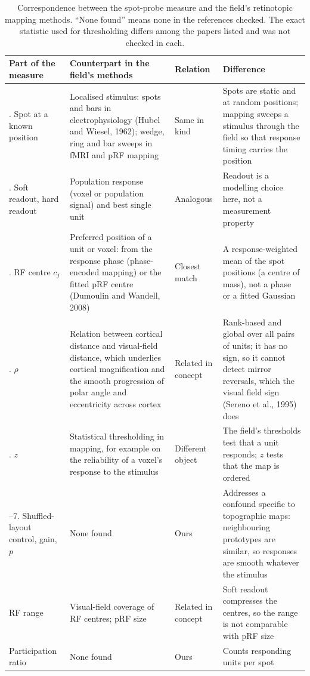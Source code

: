 \documentclass[11pt,a4paper]{article}
\newcommand{\ra}{\raggedright\arraybackslash}
\begin{document}
\begin{table}[h]
\centering\footnotesize
\setlength{\tabcolsep}{3pt}
\begin{tabular}{@{}>{\ra}p{3.0cm}>{\ra}p{4.9cm}>{\ra}p{1.9cm}>{\ra}p{4.6cm}@{}}
\toprule
Part of the measure & Counterpart in the field's methods & Relation & Difference \\
\midrule
1. Spot at a known position
  & Localised stimulus: spots and bars in electrophysiology (Hubel and Wiesel, 1962);
    wedge, ring and bar sweeps in fMRI and pRF mapping
  & Same in kind
  & Spots are static and at random positions; mapping sweeps a stimulus through the field
    so that response timing carries the position \\
2. Soft readout, hard readout
  & Population response (voxel or population signal) and best single unit
  & Analogous
  & Readout is a modelling choice here, not a measurement property \\
3. RF centre $c_j$
  & Preferred position of a unit or voxel: from the response phase (phase-encoded
    mapping) or the fitted pRF centre (Dumoulin and Wandell, 2008)
  & Closest match
  & A response-weighted mean of the spot positions (a centre of mass), not a phase
    or a fitted Gaussian \\
4. $\rho$
  & Relation between cortical distance and visual-field distance, which underlies
    cortical magnification and the smooth progression of polar angle and eccentricity
    across cortex
  & Related in concept
  & Rank-based and global over all pairs of units; it has no sign, so it cannot
    detect mirror reversals, which the visual field sign (Sereno et al., 1995) does \\
5. $z$
  & Statistical thresholding in mapping, for example on the reliability of a voxel's
    response to the stimulus
  & Different object
  & The field's thresholds test that a unit responds; $z$ tests that the map is ordered \\
6--7. Shuffled-layout control, gain, $p$
  & None found
  & Ours
  & Addresses a confound specific to topographic maps: neighbouring prototypes are
    similar, so responses are smooth whatever the stimulus \\
RF range
  & Visual-field coverage of RF centres; pRF size
  & Related in concept
  & Soft readout compresses the centres, so the range is not comparable with pRF size \\
Participation ratio
  & None found
  & Ours
  & Counts responding units per spot \\
\bottomrule
\end{tabular}
\caption{Correspondence between the spot-probe measure and the field's retinotopic
mapping methods. ``None found'' means none in the references checked. The exact
statistic used for thresholding differs among the papers listed and was not checked
in each.}
\label{tab:standard}
\end{table}
\end{document}

